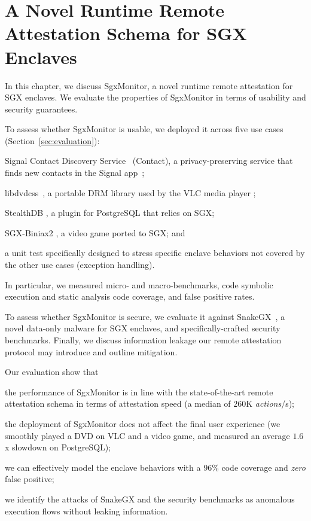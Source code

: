 \chapter{A Novel Runtime Remote Attestation Schema for SGX Enclaves} %
\label{chp:runtime-protection-trusted} 


In this chapter, we discuss SgxMonitor, a novel runtime remote attestation for 
SGX enclaves.
We evaluate the properties of SgxMonitor in terms of usability and security 
guarantees.

To assess whether SgxMonitor is usable, we deployed it across five use 
cases (Section~\ref{sec:evaluation}):
\begin{enumerate*}[label=(\roman*)]
	\item Signal Contact Discovery Service~\citep{signalrepo} 
	(\textsf{Contact}), a privacy-preserving service that finds new contacts in 
	the Signal app~\citep{signalapp};
	\item \textsf{libdvdcss}~\citep{libdvdcss}, a portable DRM library used by 
	the VLC media player \citep{videolan};
	\item \textsf{StealthDB} \citep{stealthdb}, a plugin for 
	PostgreSQL \citep{momjian2001postgresql} that relies on SGX;
	\item \textsf{SGX-Biniax2} \citep{bauman2016case}, a video game 
	ported to SGX; and
	\item a \textsf{unit test} specifically designed to stress specific 
	enclave behaviors not covered by the other use cases (\ie exception 
	handling).
\end{enumerate*}
In particular, we measured micro- and macro-benchmarks, code symbolic
execution and static analysis code coverage, and false positive rates.

To assess whether SgxMonitor is secure, we evaluate
it against SnakeGX~\citep{snakegx}, a novel data-only malware for SGX
enclaves, and specifically-crafted security benchmarks. 
Finally, we discuss information leakage our remote attestation protocol may
introduce and outline mitigation.

Our evaluation show that 
\begin{enumerate*}[label=(\roman*)]
	\item the performance of SgxMonitor is in line with the state-of-the-art
	remote attestation schema in terms of attestation speed (a median of $260$K 
	\emph{actions}/s);
	\item the deployment of SgxMonitor does not affect the final user 
	experience (\eg we smoothly played a DVD on VLC and a video game, and 
	measured an average $1.6$x slowdown on PostgreSQL);
	\item we can effectively model the enclave behaviors with a 96\% code
	coverage and \emph{zero} false positive;
	\item we identify the attacks of SnakeGX and the security benchmarks as 
	anomalous execution
	flows without leaking information.
\end{enumerate*}


